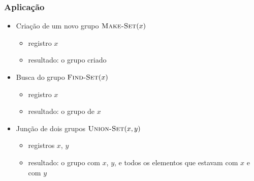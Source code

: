 \documentclass{beamer}
\begin{document}
\begin{frame}
\frametitle{Aplicação}


\begin{itemize}

  \item Criação de um novo grupo $\textnormal{\scshape Make-Set}(x)$

    \begin{itemize}

      \item registro $x$

      \item resultado: o grupo criado

    \end{itemize}

  \item Busca do grupo $\textnormal{\scshape Find-Set}(x)$

    \begin{itemize}

      \item registro $x$

      \item resultado: o grupo de $x$

    \end{itemize}
    
  \item Junção de dois grupos $\textnormal{\scshape Union-Set}(x, y)$

    \begin{itemize}

      \item registros $x$, $y$

      \item resultado: o grupo com $x$, $y$, e todos os elementos
        que estavam com $x$ e com $y$

    \end{itemize}

\end{itemize}

\end{frame}
\end{document}
